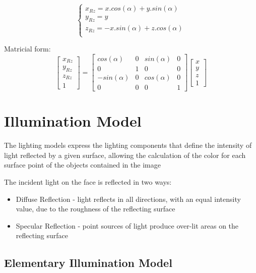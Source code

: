 \documentclass[a4paper]{article}
\begin{document}
\begin{flushleft}
\begin{equation}
\begin{cases}
	x_{Rz} = x.cos(\alpha)+y.sin(\alpha) \\
	y_{Rz} = y \\
	z_{Rz} = -x.sin(\alpha)+z.cos(\alpha) \\
\end{cases}
\end{equation}

Matricial form:
\begin{equation}
\begin{bmatrix}
	x_{Rz} \\
	y_{Rz} \\
	z_{Rz} \\
	1
\end{bmatrix}
=
\begin{bmatrix}
	cos(\alpha) & 0 & sin(\alpha) & 0 \\
	0 & 1 & 0 & 0 \\
	-sin(\alpha) & 0 & cos(\alpha) & 0 \\
	0 & 0 & 0 & 1
\end{bmatrix}
\begin{bmatrix}
	x \\
	y \\
	z \\
	1
\end{bmatrix}
\end{equation}


\section{Illumination Model}
The lighting models express the lighting components that define the intensity of light reflected by a given surface, allowing the calculation of the color for each surface point of the objects contained in the image

The incident light on the face is reflected in two ways:
\begin{itemize}
	\item Diffuse Reflection - light reflects in all directions, with an equal intensity value, due to the 		roughness of the reflecting surface
	\item Specular Reflection - point sources of light produce over-lit areas on the reflecting surface
\end{itemize}

\subsection{Elementary Illumination Model}


\end{flushleft}
\end{document}
